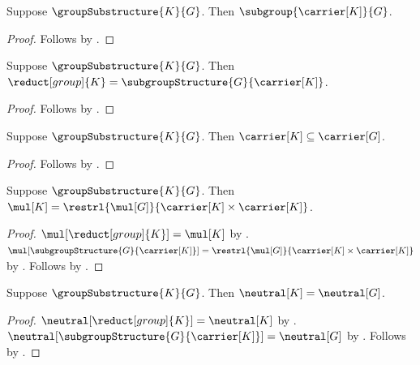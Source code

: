 \begin{proposition}\label{group_substructure_carrier_subgroup}
    Suppose $\groupSubstructure{K}{G}$.
    Then $\subgroup{\carrier[K]}{G}$.
\end{proposition}
\begin{proof}
    Follows by .
\end{proof}

\begin{proposition}\label{group_substructure_reduct}
    Suppose $\groupSubstructure{K}{G}$.
    Then
        $\reduct[group]{K}
            =\subgroupStructure{G}{\carrier[K]}$.
\end{proposition}
\begin{proof}
    Follows by .
\end{proof}

\begin{corollary}\label{group_substructure_carrier_subseteq}
    Suppose $\groupSubstructure{K}{G}$.
    Then $\carrier[K]\subseteq\carrier[G]$.
\end{corollary}
\begin{proof}
    Follows by
        .
\end{proof}

\begin{proposition}\label{group_substructure_mul_graph}
    Suppose $\groupSubstructure{K}{G}$.
    Then
        $\mul[K]=
            \restrl{\mul[G]}
                {\carrier[K]\times\carrier[K]}$.
\end{proposition}
\begin{proof}
    $\mul[\reduct[group]{K}]=\mul[K]$ by
        .
    $\mul[\subgroupStructure{G}{\carrier[K]}]
        =\restrl{\mul[G]}
            {\carrier[K]\times\carrier[K]}$ by
        .
    Follows by .
\end{proof}

\begin{proposition}\label{group_substructure_neutral}
    Suppose $\groupSubstructure{K}{G}$.
    Then $\neutral[K]=\neutral[G]$.
\end{proposition}
\begin{proof}
    $\neutral[\reduct[group]{K}]=\neutral[K]$ by
        .
    $\neutral[\subgroupStructure{G}{\carrier[K]}]
        =\neutral[G]$ by .
    Follows by .
\end{proof}

